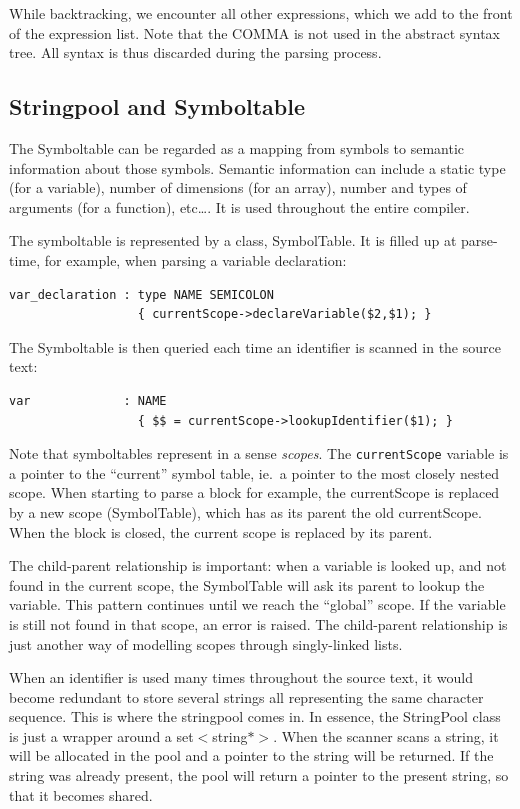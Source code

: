 \documentclass[a4paper]{article}
\begin{document}
While backtracking, we encounter all other expressions, which we add to the
front of the expression list. Note that the COMMA is not used in the abstract
syntax tree. All syntax is thus discarded during the parsing process.


\subsection{Stringpool and Symboltable}
\label{symboltable}

The Symboltable can be regarded as a mapping from symbols to semantic
information about those symbols. Semantic information can include a static
type (for a variable), number of dimensions (for an array), number and types
of arguments (for a function), etc\ldots{}. It is used throughout the entire
compiler.

The symboltable is represented by a class, SymbolTable. It is filled up at
parse-time, for example, when parsing a variable declaration:
\begin{verbatim}
var_declaration	: type NAME SEMICOLON
                  { currentScope->declareVariable($2,$1); }
\end{verbatim}

The Symboltable is then queried each time an identifier is scanned in the
source text:
\begin{verbatim}
var             : NAME
                  { $$ = currentScope->lookupIdentifier($1); }
\end{verbatim}
Note that symboltables represent in a sense \emph{scopes}. The
\texttt{currentScope} variable is a pointer to the ``current'' symbol table,
ie.~a pointer to the most closely nested scope. When starting to parse a block
for example, the currentScope is replaced by a new scope (SymbolTable), which
has as its parent the old currentScope. When the block is closed, the current
scope is replaced by its parent.

The child-parent relationship is important: when a variable is looked up, and
not found in the current scope, the SymbolTable will ask its parent to lookup
the variable. This pattern continues until we reach the ``global'' scope. If
the variable is still not found in that scope, an error is raised. The
child-parent relationship is just another way of modelling scopes through
singly-linked lists.

When an identifier is used many times throughout the source text, it would
become redundant to store several strings all representing the same character
sequence. This is where the stringpool comes in. In essence, the StringPool
class is just a wrapper around a set$<$string$*>$. When the scanner scans a
string, it will be allocated in the pool and a pointer to the string will be
returned. If the string was already present, the pool will return a pointer to
the present string, so that it becomes shared.
\end{document}
